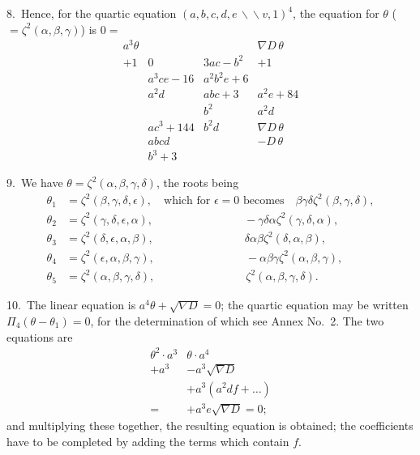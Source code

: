 \documentclass[11pt,a4paper]{article}
\theoremstyle{plain}
\theoremstyle{definition}
\theoremstyle{remark}
\begin{document}
8.\ Hence, for the quartic equation $(a,b,c,d,e\,\backslash\!\!\backslash v,1)^4$, the equation for $\theta$ ($=\zeta^2(\alpha,\beta,\gamma)$) is $0=$
\[
\begin{array}{cccc}
a^3\theta & & & \nabla D\,\theta\\
+1 & 0 & 3ac-b^2 & +1\\
& a^3ce-16 & a^2b^2e+6 & \\[-4pt]
& a^2d & abc+3 & a^2e+84\\[-4pt]
& & b^2 & a^2d\\[-4pt]
& ac^3+144 & b^2d & \nabla D\,\theta\\
& abcd & & -D\,\theta\\
& b^3+3 & &
\end{array}
\]

\newpage
\setcounter{page}{303}

9.\ We have $\theta=\zeta^2(\alpha,\beta,\gamma,\delta)$, the roots being
\begin{align*}
\theta_1 &= \zeta^2(\beta,\gamma,\delta,\epsilon),\quad \text{which for }\epsilon=0\text{ becomes}\quad \beta\gamma\delta\zeta^2(\beta,\gamma,\delta),\\
\theta_2 &= \zeta^2(\gamma,\delta,\epsilon,\alpha),\qquad\qquad\qquad\qquad -\gamma\delta\alpha\zeta^2(\gamma,\delta,\alpha),\\
\theta_3 &= \zeta^2(\delta,\epsilon,\alpha,\beta),\qquad\qquad\qquad\qquad \delta\alpha\beta\zeta^2(\delta,\alpha,\beta),\\
\theta_4 &= \zeta^2(\epsilon,\alpha,\beta,\gamma),\qquad\qquad\qquad\qquad -\alpha\beta\gamma\zeta^2(\alpha,\beta,\gamma),\\
\theta_5 &= \zeta^2(\alpha,\beta,\gamma,\delta),\qquad\qquad\qquad\qquad \zeta^2(\alpha,\beta,\gamma,\delta).
\end{align*}

10.\ The linear equation is $a^4\theta + \sqrt{\nabla D}=0$; the quartic equation may be written $\Pi_4(\theta - \theta_1)=0$, for the determination of which see Annex No.~2. The two equations are
\[
\begin{array}{cc}
\theta^2\cdot a^3 & \theta\cdot a^4 \\
+ a^3 & -a^3\sqrt{\nabla D} \\
& + a^3(a^2df + \dots) \\
= & +a^3e\sqrt{\nabla D} = 0;
\end{array}
\]
and multiplying these together, the resulting equation is obtained; the coefficients have to be completed by adding the terms which contain $f$.
\end{document}
